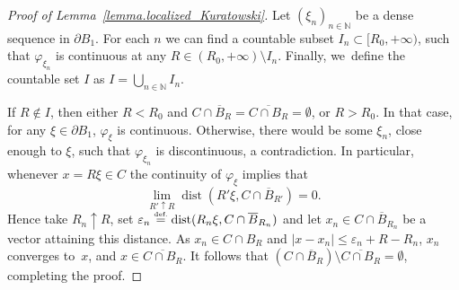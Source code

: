 \documentclass[JEP,XML,SOM,Unicode,NoFloatCountersInSection,published]{cedram}
\theoremstyle{definition}
\newcommand{\eqdef}{\ensuremath{\stackrel{\mbox{\upshape\tiny def.}}{=}}}
\DeclareMathOperator{\dist}{dist}
\newcommand{\oB}{\overline{B}}
\begin{document}
\begin{proof}[Proof of Lemma~\ref{lemma.localized_Kuratowski}]
Let $(\xi_n)_{n \in \mathbb{N}}$ be a dense sequence in $\partial B_1$.
For each $n$ we can find a countable subset $I_n\subset [R_0,+\infty)$, such that $\varphi_{\xi_n}$
is continuous at any $R\in (R_0,+\infty)\setminus I_n$.
Finally, we~define the countable set $I$ as
$
I= \bigcup_{n\in \mathbb{N}} I_n.
$

If $R\not\in I$, then either $R<R_0$ and
$C\cap\oB_R=\overline{C\cap B_R}=\emptyset$, or
$R>R_0$. In that case, for any $\xi\in\partial B_1$,
$\varphi_\xi$ is continuous. Otherwise, there would be some $\xi_n$,
close enough to $\xi$, such that $\varphi_{\xi_n}$ is discontinuous,
a contradiction. In particular, whenever $x = R\xi \in C$ the continuity of $\varphi_\xi$ implies that
\[
\lim_{R'\uparrow R}\dist(R'\xi,C\cap \oB_{R'})=0.
\]
Hence take $R_n \uparrow R$, set $\varepsilon_n \eqdef \dist(R_n\xi,C\cap \oB_{R_n})$ and let $x_n \in C\cap \oB_{R_n}$ be a vector attaining this distance. As $x_n \in C \cap B_R$ and $|x - x_n| \le \varepsilon_n + R - R_n$, $x_n$ converges to~$x$, and $x\in \overline{C\cap B_R}$. It follows that $(C\cap\oB_R)\setminus
\overline{C\cap B_R}=\emptyset$, completing the proof.
\end{proof}
\end{document}
